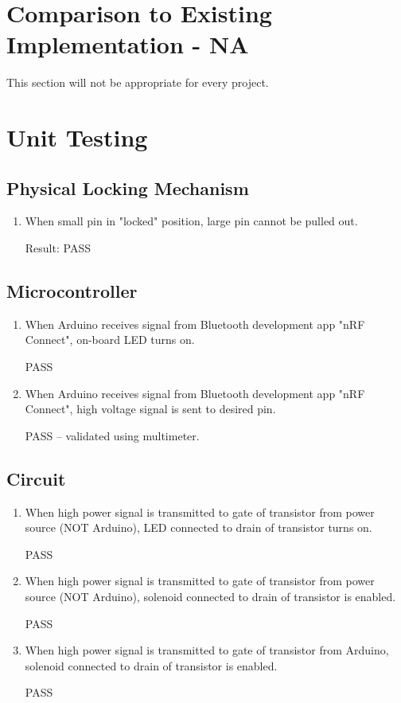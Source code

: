 \documentclass[12pt, titlepage]{article}
\begin{document}
\section{Comparison to Existing Implementation - NA}	

This section will not be appropriate for every project.

\section{Unit Testing}

\subsection{Physical Locking Mechanism}
\begin{enumerate}
    \item When small pin in "locked" position, large pin cannot be pulled out.

    Result: PASS
\end{enumerate}

\subsection{Microcontroller}
\begin{enumerate}
    \item When Arduino receives signal from Bluetooth development app "nRF Connect", on-board LED turns on.

    PASS

    \item When Arduino receives signal from Bluetooth development app "nRF Connect", high voltage signal is sent to desired pin.

    PASS -- validated using multimeter.
\end{enumerate}

\subsection{Circuit}
\begin{enumerate}
    \item When high power signal is transmitted to gate of transistor from power source (NOT Arduino), LED connected to drain of transistor turns on.

    PASS
    \item When high power signal is transmitted to gate of transistor from power source (NOT Arduino), solenoid connected to drain of transistor is enabled.

    PASS
    \item When high power signal is transmitted to gate of transistor from Arduino, solenoid connected to drain of transistor is enabled.

    PASS
\end{enumerate}
\end{document}
